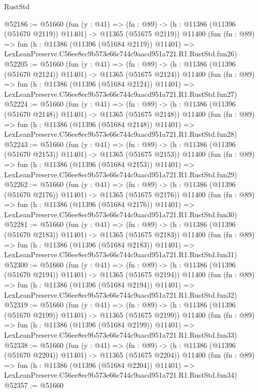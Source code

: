 \begin{lexlean}{RustStd}
\begin{coremodule}
@52186 := @51660
    (fun (y : @41) =>
    (fn : @89) -> (h : @11386 (@11396 (@51670 @2119)) @11401) -> @11365 (@51675 @2119))
    @11400
    (fun (fn : @89) =>
    fun (h : @11386 (@11396 (@51684 @2119)) @11401) =>
    LexLeanPreserve.C56ee8ec9b573e66c744c9aacd951a721.R1.RustStd.fun26)
@52205 := @51660
    (fun (y : @41) =>
    (fn : @89) -> (h : @11386 (@11396 (@51670 @2124)) @11401) -> @11365 (@51675 @2124))
    @11400
    (fun (fn : @89) =>
    fun (h : @11386 (@11396 (@51684 @2124)) @11401) =>
    LexLeanPreserve.C56ee8ec9b573e66c744c9aacd951a721.R1.RustStd.fun27)
@52224 := @51660
    (fun (y : @41) =>
    (fn : @89) -> (h : @11386 (@11396 (@51670 @2148)) @11401) -> @11365 (@51675 @2148))
    @11400
    (fun (fn : @89) =>
    fun (h : @11386 (@11396 (@51684 @2148)) @11401) =>
    LexLeanPreserve.C56ee8ec9b573e66c744c9aacd951a721.R1.RustStd.fun28)
@52243 := @51660
    (fun (y : @41) =>
    (fn : @89) -> (h : @11386 (@11396 (@51670 @2153)) @11401) -> @11365 (@51675 @2153))
    @11400
    (fun (fn : @89) =>
    fun (h : @11386 (@11396 (@51684 @2153)) @11401) =>
    LexLeanPreserve.C56ee8ec9b573e66c744c9aacd951a721.R1.RustStd.fun29)
@52262 := @51660
    (fun (y : @41) =>
    (fn : @89) -> (h : @11386 (@11396 (@51670 @2176)) @11401) -> @11365 (@51675 @2176))
    @11400
    (fun (fn : @89) =>
    fun (h : @11386 (@11396 (@51684 @2176)) @11401) =>
    LexLeanPreserve.C56ee8ec9b573e66c744c9aacd951a721.R1.RustStd.fun30)
@52281 := @51660
    (fun (y : @41) =>
    (fn : @89) -> (h : @11386 (@11396 (@51670 @2183)) @11401) -> @11365 (@51675 @2183))
    @11400
    (fun (fn : @89) =>
    fun (h : @11386 (@11396 (@51684 @2183)) @11401) =>
    LexLeanPreserve.C56ee8ec9b573e66c744c9aacd951a721.R1.RustStd.fun31)
@52300 := @51660
    (fun (y : @41) =>
    (fn : @89) -> (h : @11386 (@11396 (@51670 @2194)) @11401) -> @11365 (@51675 @2194))
    @11400
    (fun (fn : @89) =>
    fun (h : @11386 (@11396 (@51684 @2194)) @11401) =>
    LexLeanPreserve.C56ee8ec9b573e66c744c9aacd951a721.R1.RustStd.fun32)
@52319 := @51660
    (fun (y : @41) =>
    (fn : @89) -> (h : @11386 (@11396 (@51670 @2199)) @11401) -> @11365 (@51675 @2199))
    @11400
    (fun (fn : @89) =>
    fun (h : @11386 (@11396 (@51684 @2199)) @11401) =>
    LexLeanPreserve.C56ee8ec9b573e66c744c9aacd951a721.R1.RustStd.fun33)
@52338 := @51660
    (fun (y : @41) =>
    (fn : @89) -> (h : @11386 (@11396 (@51670 @2204)) @11401) -> @11365 (@51675 @2204))
    @11400
    (fun (fn : @89) =>
    fun (h : @11386 (@11396 (@51684 @2204)) @11401) =>
    LexLeanPreserve.C56ee8ec9b573e66c744c9aacd951a721.R1.RustStd.fun34)
@52357 := @51660

\end{coremodule}
\end{lexlean}
